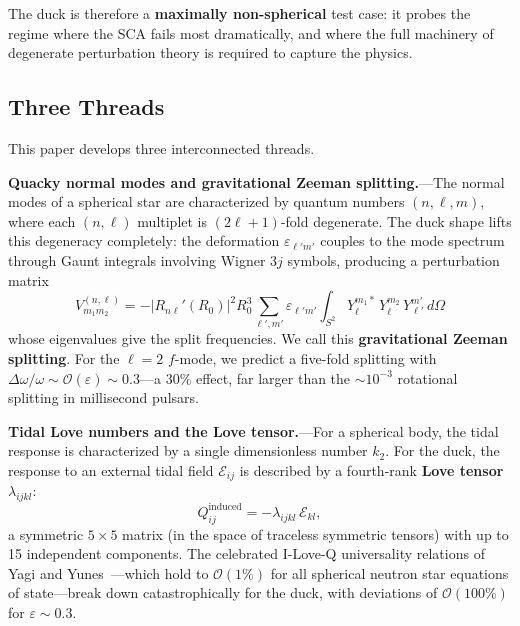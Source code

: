 \documentclass[aps,prd,twocolumn,superscriptaddress,nofootinbib]{revtex4-2}
\newcommand{\order}[1]{\mathcal{O}(#1)}
\begin{document}
The duck is therefore a \textbf{maximally non-spherical} test case: it
probes the regime where the SCA fails most dramatically, and where the full
machinery of degenerate perturbation theory is required to capture the
physics.


\subsection{Three Threads}
\label{sec:three_threads}

This paper develops three interconnected threads.

\textbf{Quacky normal modes and gravitational Zeeman splitting.}---The
normal modes of a spherical star are characterized by quantum numbers
$(n, \ell, m)$, where each $(n, \ell)$ multiplet is $(2\ell + 1)$-fold
degenerate.
The duck shape lifts this degeneracy completely: the deformation
$\varepsilon_{\ell' m'}$ couples to the mode spectrum through Gaunt
integrals involving Wigner $3j$ symbols, producing a perturbation matrix
\begin{equation}
V_{m_1 m_2}^{(n,\ell)} = -|R_{n\ell}'(R_0)|^2 R_0^3 \sum_{\ell', m'}
\varepsilon_{\ell' m'} \int_{S^2} Y_\ell^{m_1 *}\, Y_\ell^{m_2}\,
Y_{\ell'}^{m'}\, d\Omega
\label{eq:Vmatrix_intro}
\end{equation}
whose eigenvalues give the split frequencies.
We call this \textbf{gravitational Zeeman splitting}.
For the $\ell = 2$ $f$-mode, we predict a five-fold splitting with
$\Delta\omega / \omega \sim \order{\varepsilon} \sim 0.3$---a 30\% effect,
far larger than the $\sim 10^{-3}$ rotational splitting in millisecond
pulsars.

\textbf{Tidal Love numbers and the Love tensor.}---For a spherical body,
the tidal response is characterized by a single dimensionless number $k_2$.
For the duck, the response to an external tidal field $\mathcal{E}_{ij}$ is
described by a fourth-rank \textbf{Love tensor} $\lambda_{ijkl}$:
\begin{equation}
Q_{ij}^{\mathrm{induced}} = -\lambda_{ijkl}\, \mathcal{E}_{kl},
\label{eq:love_tensor_intro}
\end{equation}
a symmetric $5 \times 5$ matrix (in the space of traceless symmetric
tensors) with up to 15 independent components.
The celebrated I-Love-Q universality relations of Yagi and
Yunes~\cite{YagiYunes2013a, YagiYunes2013b}---which hold to
$\order{1\%}$ for all spherical neutron star equations of state---break
down catastrophically for the duck, with deviations of $\order{100\%}$ for
$\varepsilon \sim 0.3$.
\end{document}
